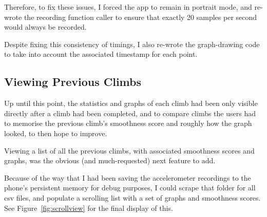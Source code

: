 Therefore, to fix these issues, I forced the app to remain in portrait mode, and re-wrote the recording function caller to ensure that exactly 20 samples per second would always be recorded.

Despite fixing this consistency of timings, I also re-wrote the graph-drawing code to take into account the associated timestamp for each point.






\subsection{Viewing Previous Climbs}
Up until this point, the statistics and graphs of each climb had been only visible directly after a climb had been completed, and to compare climbs the users had to memorise the previous climb's smoothness score and roughly how the graph looked, to then hope to improve.

Viewing a list of all the previous climbs, with associated smoothness scores and graphs, was the obvious (and much-requested) next feature to add.

Because of the way that I had been saving the accelerometer recordings to the phone's persistent memory for debug purposes, I could scrape that folder for all csv files, and populate a scrolling list with a set of graphs and smoothness scores.
See Figure~\ref{fig:scrollview} for the final display of this.

